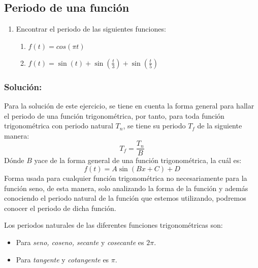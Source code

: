 





\begin{multicols}{2}

\section{Periodo de una función}

\begin{enumerate}
    \item Encontrar el periodo de las siguientes funciones:
    \begin{enumerate}
        \item $f(t) = cos \left(\pi t\right)$ 
        \item $f(t) = \sin \left(t\right) + \sin \left(\frac{t}{3}\right) + \sin \left(\frac{t}{5}\right)$
    \end{enumerate} 
\end{enumerate}

\subsubsection*{\textbf{Solución:}}


Para la solución de este ejercicio, se tiene en cuenta la forma general para hallar el periodo de una función trigonométrica, por tanto, para toda función trigonométrica con periodo natural $T_n$, se tiene su periodo $T_f$ de la siguiente manera:
\begin{equation}
    T_f = \frac{T_n}{B}
\label{eq1}
\end{equation}
Dónde $B$ yace de la forma general de una función trigonométrica, la cuál es:
\begin{equation*}
    f(t) = A\sin\left(Bx + C\right) + D
\end{equation*}
Forma usada para cualquier función trigonométrica no necesariamente para la función seno, de esta manera, solo analizando la forma de la función y además conociendo el periodo natural de la función que estemos utilizando, podremos conocer el periodo de dicha función.

Los periodos naturales de las diferentes funciones trigonométricas son:

\begin{itemize}
    \item Para \textit{seno, coseno, secante} y \textit{cosecante} es $2\pi$.
    \item Para \textit{tangente} y \textit{cotangente} es $\pi$.
\end{itemize}


\end{multicols}

